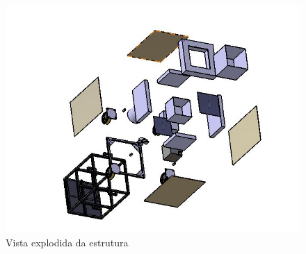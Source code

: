 \begin{figure}[H]
	\centering
	\includegraphics[scale=.5]{figuras/VistaExplodida.jpg}
	\caption{Vista explodida da estrutura}
\end{figure}

